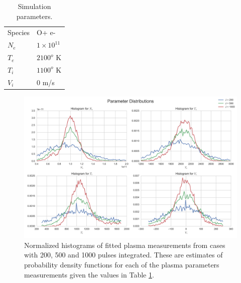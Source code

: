 \begin{table}[!t]
\centering
\caption{Simulation parameters.}
\label{tb:param1}
\begin{tabular}{ll}
Species & O+ e-\\
$N_e$    & $1\times 10^{11}$ \\
$T_e$      & $2100^o$ K   \\
$T_i$      & $1100^o$ K \\
$V_i$      & $0$ m/s
\end{tabular}
\end{table}

\begin{figure}[!t]
\centering
\includegraphics[width=5in]{datahist}
\caption{Normalized histograms of fitted plasma measurements from cases with 200, 500 and 1000 pulses integrated. These are estimates of probability density functions for each of the plasma parameters measurements given the values in Table \ref{tb:param1}.}
\label{fig:statshistall}
\end{figure}

